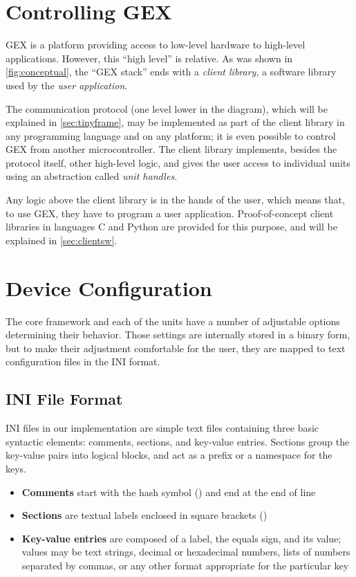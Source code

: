 \section{Controlling GEX}

GEX is a platform providing access to low-level hardware to high-level applications. However, this ``high level'' is relative. As was shown in \cref{fig:conceptual}, the ``GEX stack'' ends with a \textit{client library}, a software library used by the \textit{user application}.

The communication protocol (one level lower in the diagram), which will be explained in \cref{sec:tinyframe}, may be implemented as part of the client library in any programming language and on any platform; it is even possible to control GEX from another microcontroller. The client library implements, besides the protocol itself, other high-level logic, and gives the user access to individual units using an abstraction called \textit{unit handles}.

Any logic above the client library is in the hands of the user, which means that, to use GEX, they have to program a user application. Proof-of-concept client libraries in languages C and Python are provided for this purpose, and will be explained in \cref{sec:clientsw}.

\section{Device Configuration}

The core framework and each of the units have a number of adjustable options determining their behavior. Those settings are internally stored in a binary form, but to make their adjustment comfortable for the user, they are mapped to text configuration files in the INI format.

\subsection{INI File Format}

INI files in our implementation are simple text files containing three basic syntactic elements: comments, sections, and key-value entries. Sections group the key-value pairs into logical blocks, and act as a prefix or a namespace for the keys.

\begin{itemize}	
	\item \textbf{Comments} start with the hash symbol (\mono{\#}) and end at the end of line
	\item \textbf{Sections} are textual labels enclosed in square brackets (\mono{[UNITS]})
	\item \textbf{Key-value entries} are composed of a label, the equals sign, and its value; values may be text strings, decimal or hexadecimal numbers, lists of numbers separated by commas, or any other format appropriate for the particular key
\end{itemize}

